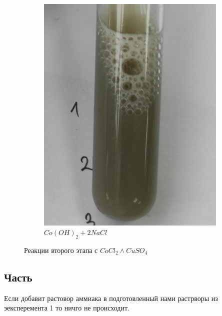\begin{figure}[h]
\begin{subfigure}[b]{0.45\textwidth}
        \includegraphics[width=\textwidth]{Ex_5/Co_2.jpg}
        \caption{$Co(OH)_2 + 2NaCl$}
    \end{subfigure}
    \caption{Реакции второго этапа с $CoCl_2 \land CuSO_4$}
\end{figure}


\subsection{Часть}

Если добавит растовор аммиака в подготовленный нами растрворы 
из эексперемента 1 то ничго не происходит. 










